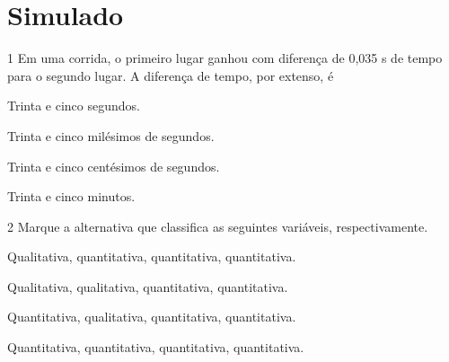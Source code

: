 \chapter[Simulado 3]{Simulado}

\num{1} Em uma corrida, o primeiro lugar ganhou com diferença de 0,035 s de
tempo para o segundo lugar. A diferença de tempo, por extenso, é

\begin{escolha}
\item Trinta e cinco segundos.
\item Trinta e cinco milésimos de segundos.
\item Trinta e cinco centésimos de segundos.
\item Trinta e cinco minutos.
\end{escolha}






\num{2} Marque a alternativa que classifica as seguintes variáveis,
respectivamente. 

\begin{myquote}
\end{myquote}

\begin{escolha}
\item Qualitativa, quantitativa, quantitativa, quantitativa.
\item Qualitativa, qualitativa, quantitativa, quantitativa.
\item Quantitativa, qualitativa, quantitativa, quantitativa.
\item Quantitativa, quantitativa, quantitativa, quantitativa.
\end{escolha}


